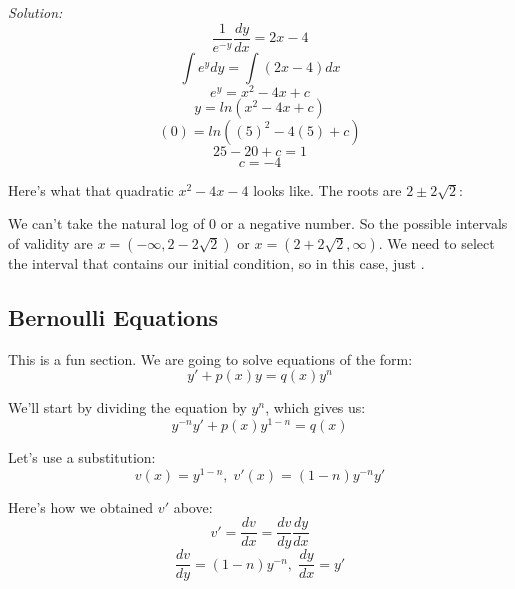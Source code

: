 \textit{Solution:}
$$\frac{1}{e^{-y}}\frac{dy}{dx} = 2x - 4$$
$$\int e^{y}dy = \int (2x - 4)dx$$
$$e^{y} = x^{2} - 4x + c$$
$$y = ln(x^{2} - 4x + c)$$
$$(0) = ln((5)^{2} - 4(5) + c)$$
$$25 - 20 + c = 1$$
$$c = -4$$
\begin{center}
\end{center}

\pagebreak

Here's what that quadratic $x^{2} - 4x - 4$ looks like. The roots are $2 \pm 2\sqrt{2}$:
\begin{center}
\end{center}

We can't take the natural log of 0 or a negative number. So the possible intervals of validity are $x = (-\infty, 2 - 2\sqrt{2})$ or $x = (2 + 2\sqrt{2}, \infty)$. We need to select the interval that contains our initial condition, so in this case, just .

\subsection{Bernoulli Equations}
This is a fun section. We are going to solve equations of the form:
$$y' + p(x)y = q(x)y^{n}$$

We'll start by dividing the equation by $y^{n}$, which gives us:
\begin{equation}
	y^{-n}y' + p(x)y^{1 - n} = q(x)
\end{equation}

Let's use a substitution:
$$v(x) = y^{1 - n},\; v'(x) = (1 - n)y^{-n}y'$$

Here's how we obtained $v'$ above:
$$v' = \frac{dv}{dx} = \frac{dv}{dy}\frac{dy}{dx}$$
$$\frac{dv}{dy} = (1 - n)y^{-n},\; \frac{dy}{dx} = y'$$

